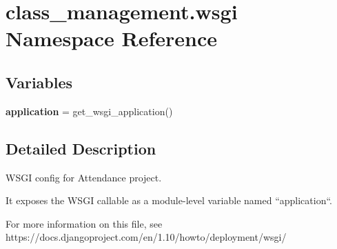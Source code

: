 \hypertarget{namespaceclass__management_1_1wsgi}{}\section{class\+\_\+management.\+wsgi Namespace Reference}
\label{namespaceclass__management_1_1wsgi}
\subsection*{Variables}
\begin{DoxyCompactItemize}
\item 
\hypertarget{namespaceclass__management_1_1wsgi_a8dc5f6fee05b27fbad8220a0e6393f63}{}\label{namespaceclass__management_1_1wsgi_a8dc5f6fee05b27fbad8220a0e6393f63} 
{\bfseries application} = get\+\_\+wsgi\+\_\+application()
\end{DoxyCompactItemize}


\subsection{Detailed Description}
\begin{DoxyVerb}WSGI config for Attendance project.

It exposes the WSGI callable as a module-level variable named ``application``.

For more information on this file, see
https://docs.djangoproject.com/en/1.10/howto/deployment/wsgi/
\end{DoxyVerb}
 